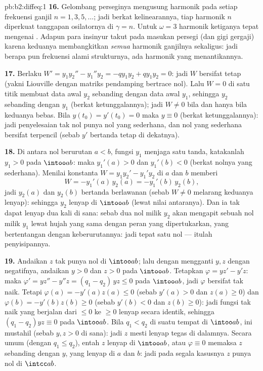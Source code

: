 \begin{solution}{pb:b2:diffeq:1}
\textbf{16.} Gelombang perseginya mengusung harmonik pada setiap
frekuensi ganjil $n = 1, 3, 5, \dots$; jadi berkat kelinearannya, tiap harmonik
$n$ diperkuat tanggapan osilatornya di $\gamma = n$.
Untuk $\omega = 3$ harmonik ketiganya tepat mengenai .
Adapun para insinyur takut pada masukan persegi (dan gigi gergaji) karena keduanya
membangkitkan \emph{semua} harmonik ganjilnya sekaligus: jadi berapa pun frekuensi
alami strukturnya, ada harmonik yang menantikannya.

\textbf{17.} Berlaku $W' = y_1y_2'' - y_1''y_2 = -qy_1y_2 + qy_1y_2 =
0$: jadi $W$ bersifat tetap (yakni Liouville dengan matriks pendamping
bertrace nol). Lalu $W = 0$ di satu titik membuat data awal $y_2$
sebanding dengan data awal $y_1$, sehingga $y_2$ sebanding dengan
$y_1$ (berkat ketunggalannya); jadi $W \neq 0$ bila dan hanya bila keduanya bebas. Bila $y(t_0) =
y'(t_0) = 0$ maka $y \equiv 0$ (berkat ketunggalannya): jadi penyelesaian tak
nol punya nol yang sederhana, dan nol yang sederhana bersifat terpencil
(sebab $y'$ bertanda tetap di dekatnya).

\textbf{18.} Di antara nol berurutan $a < b$, fungsi $y_1$ menjaga
satu tanda, katakanlah $y_1 > 0$ pada $\intoo ab$: maka $y_1'(a) > 0$ dan
$y_1'(b) < 0$ (berkat nolnya yang sederhana). Menilai konstanta $W =
y_1y_2' - y_1'y_2$ di $a$ dan $b$ memberi
\[
W = -y_1'(a)\,y_2(a) = -y_1'(b)\,y_2(b) ,
\]
jadi $y_2(a)$ dan $y_2(b)$ bertanda berlawanan (sebab $W \neq 0$
melarang keduanya lenyap): sehingga $y_2$ lenyap di $\intoo ab$
(lewat nilai antaranya). Dan ia tak dapat lenyap dua kali di sana: sebab dua nol
milik $y_2$ akan mengapit sebuah nol milik $y_1$ lewat hujah yang sama dengan
peran yang dipertukarkan, yang bertentangan dengan keberurutannya: jadi tepat
satu nol --- itulah penyisipannya.

\textbf{19.} Andaikan $z$ tak punya nol di $\intoo ab$; lalu dengan mengganti
$y, z$ dengan negatifnya, andaikan $y > 0$ dan $z > 0$ pada
$\intoo ab$. Tetapkan $\varphi = yz' - y'z$: maka $\varphi' = yz'' -
y''z = (q_1 - q_2)\,yz \leq 0$ pada $\intoo ab$, jadi $\varphi$ bersifat
tak naik. Tetapi $\varphi(a) = -y'(a)z(a) \leq 0$ (sebab
$y'(a) > 0$ dan $z(a) \geq 0$) dan $\varphi(b) = -y'(b)z(b) \geq
0$ (sebab $y'(b) < 0$ dan $z(b) \geq 0$): jadi fungsi tak naik yang
berjalan dari $\leq 0$ ke $\geq 0$ lenyap secara identik, sehingga
$(q_1 - q_2)yz \equiv 0$ pada $\intoo ab$. Bila $q_1 < q_2$
di suatu tempat di $\intoo ab$, ini mustahil (sebab $y, z > 0$ di sana):
jadi $z$ mesti lenyap tegas di dalamnya. Secara umum (dengan $q_1 \leq q_2$),
entah $z$ lenyap di $\intoo ab$, atau $\varphi \equiv 0$
memaksa $z$ sebanding dengan $y$, yang lenyap di $a$ dan $b$:
jadi pada segala kasusnya $z$ punya nol di $\intcc ab$.


\end{solution}
